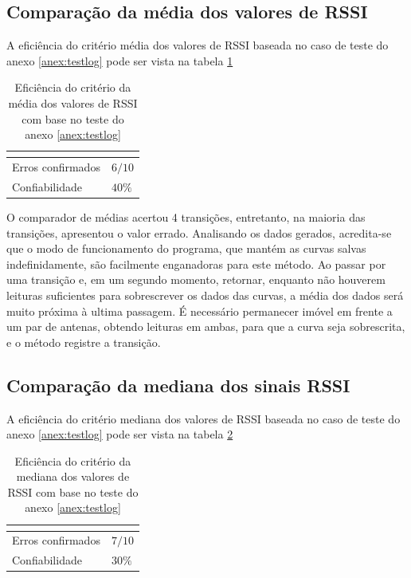 \subsection{Comparação da média dos valores de RSSI}

A eficiência do critério média dos valores de RSSI baseada no caso de teste do anexo \ref{anex:testlog} pode ser vista na tabela \ref{tab:resultados3}

\begin{table}[H]
\centering
\caption{Eficiência do critério da média dos valores de RSSI com base no teste do anexo \ref{anex:testlog} }
\label{tab:resultados3}
\begin{tabular}{p{5cm} p{5cm}}
\hline
\multicolumn{2}{c}{\cellcolor{lightgray}{Eficiência do critério: Média dos valores de RSSI}} \\ \hline
Erros confirmados          &  $6 / 10$        \\
Confiabilidade & $40\%$ \\ \hline
\end{tabular}
\end{table}

O comparador de médias acertou 4 transições, entretanto, na maioria das transições, apresentou o valor errado. Analisando os dados gerados, acredita-se que o modo de funcionamento do programa, que mantém as curvas salvas indefinidamente, são facilmente enganadoras para este método. Ao passar por uma transição e, em um segundo momento, retornar, enquanto não houverem leituras suficientes para sobrescrever os dados das curvas, a média dos dados será muito próxima à ultima passagem. É necessário permanecer imóvel em frente a um par de antenas, obtendo leituras em ambas, para que a curva seja sobrescrita, e o método registre a transição.

\subsection{Comparação da mediana dos sinais RSSI}

A eficiência do critério mediana dos valores de RSSI baseada no caso de teste do anexo \ref{anex:testlog} pode ser vista na tabela \ref{tab:resultados4}

\begin{table}[H]
\centering
\caption{Eficiência do critério da mediana dos valores de RSSI com base no teste do anexo \ref{anex:testlog} }
\label{tab:resultados4}
\begin{tabular}{p{5cm} p{5cm}}
\hline
\multicolumn{2}{c}{\cellcolor{lightgray}{Eficiência do critério: Mediana dos valores de RSSI}} \\ \hline
Erros confirmados          &  $7 / 10$        \\
Confiabilidade & $30\%$ \\ \hline
\end{tabular}
\end{table}

